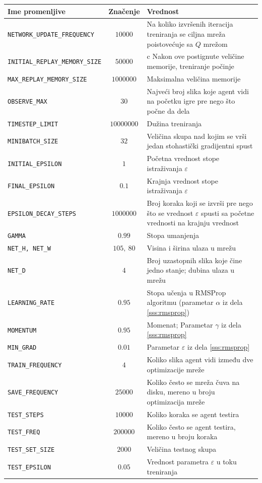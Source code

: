 \begin{table}
 \begin{tabularx}{\textwidth}{|l|c|X|} 
 \hline
 Ime promenljive & Značenje & Vrednost \\ 
 \hline\hline
 \texttt{NETWORK\_UPDATE\_FREQUENCY} & $10000$ & Na koliko izvršenih iteracija treniranja se ciljna mreža poistovećuje sa $Q$ mrežom  \\ 
 \hline
 \texttt{INITIAL\_REPLAY\_MEMORY\_SIZE} & $50000$ & c Nakon ove postignute veličine memorije, treniranje počinje \\
 \hline
 \texttt{MAX\_REPLAY\_MEMORY\_SIZE} & $1000000$ & Maksimalna veličina memorije  \\
 \hline
 \texttt{OBSERVE\_MAX} & $30$ & Najveći broj slika koje agent vidi na početku igre pre nego što počne da dela  \\
 \hline
 \texttt{TIMESTEP\_LIMIT} & $10000000$ & Dužina treniranja  \\
 \hline
 \texttt{MINIBATCH\_SIZE} & $32$ & Veličina skupa nad kojim se vrši jedan stohastički gradijentni spust  \\
 \hline
 \texttt{INITIAL\_EPSILON} & $1$ & Početna vrednost stope istraživanja $\varepsilon$  \\
 \hline
 \texttt{FINAL\_EPSILON} & $0.1$ & Krajnja vrednost stope istraživanja $\varepsilon$  \\
 \hline
 \texttt{EPSILON\_DECAY\_STEPS} & $1000000$ & Broj koraka koji se izvrši pre nego što se vrednost $\varepsilon$ spusti sa početne vrednosti na krajnju vrednost  \\
 \hline
 \texttt{GAMMA} & $0.99$ & Stopa umanjenja  \\
 \hline
 \texttt{NET\_H, NET\_W} & $105,~80$ & Visina i širina ulaza u mrežu  \\
 \hline
 \texttt{NET\_D} & $4$ & Broj uzastopnih slika koje čine jedno stanje; dubina ulaza u mrežu  \\
 \hline
 \texttt{LEARNING\_RATE} & $0.95$ & Stopa učenja u RMSProp algoritmu (parametar $\alpha$ iz dela \ref{sss:rmsprop})  \\
 \hline
 \texttt{MOMENTUM} & $0.95$ & Momenat; Parametar $\gamma$ iz dela \ref{sss:rmsprop}  \\
 \hline
 \texttt{MIN\_GRAD} & $0.01$ & Parametar $\varepsilon$ iz dela \ref{sss:rmsprop}  \\
 \hline
 \texttt{TRAIN\_FREQUENCY} & $4$ & Koliko slika agent vidi između dve optimizacije mreže  \\
 \hline
 \texttt{SAVE\_FREQUENCY} & $25000$ & Koliko često se mreža čuva na disku, mereno u broju optimizacija mreže  \\
 \hline
 \texttt{TEST\_STEPS} & $10000$ & Koliko koraka se agent testira  \\
 \hline
 \texttt{TEST\_FREQ} & $200000$ & Koliko često se agent testira, mereno u broju koraka  \\
 \hline
 \texttt{TEST\_SET\_SIZE} & $2000$ & Veličina testnog skupa  \\
 \hline
 \texttt{TEST\_EPSILON} & $0.05$ & Vrednost parametra $\varepsilon$ u toku treniranja  \\
 \hline


\end{tabularx}
\end{table}
